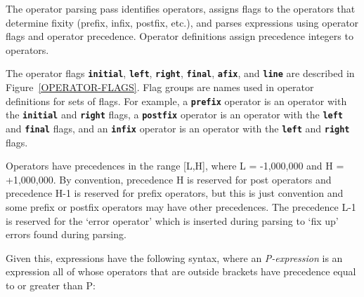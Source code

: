 \documentclass[12pt]{article}
\newcommand{\TT}[1]{{\tt \bfseries #1}}
\begin{document}
The operator parsing pass identifies operators, assigns flags
to the operators that determine fixity (prefix, infix, postfix, etc.),
and parses expressions using operator flags and operator precedence.
Operator definitions assign precedence integers to operators.

The operator flags \TT{initial}, \TT{left}, \TT{right}, \TT{final},
\TT{afix}, and \TT{line} are described in Figure~\ref{OPERATOR-FLAGS}.
Flag groups are names used in operator definitions for sets of flags.
For example, a \TT{prefix} operator is an operator with the
\TT{initial} and \TT{right} flags, a \TT{postfix} operator
is an operator with the \TT{left} and \TT{final} flags, and an
\TT{infix} operator is an operator with the \TT{left} and \TT{right}
flags.

Operators have precedences in the range [L,H],
where L = -1,000,000 and H = +1,000,000.  By convention,
precedence H is reserved for post operators and precedence H-1 is
reserved for prefix operators, but this is just convention and
some prefix or postfix operators may have other precedences.
The precedence L-1 is reserved for the `error operator' which is
inserted during parsing to `fix up' errors found during parsing.

Given this, expressions have the following syntax,
where an {\em P-expression}
is an expression all of whose operators that are outside brackets
have precedence equal to or greater than P:
\end{document}
